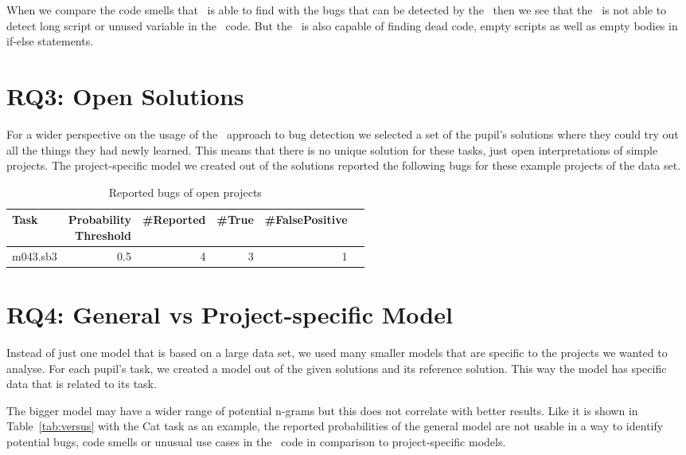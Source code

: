 When we compare the code smells that \litterbox\ is able to find with the bugs that can be detected by the \ngram\, then we see that the \ngram\ is not able to detect long script or unused variable in the \scratch\ code. But the \ngram\ is also capable of finding dead code, empty scripts as well as empty bodies in if-else statements. 
 

\section{RQ3: Open Solutions}\label{sec:gram_size}
For a wider perspective on the usage of the \ngram\ approach to bug detection we selected a set of the pupil's solutions where they could try out all the things they had newly learned. This means that there is no unique solution for these tasks, just open interpretations of simple projects. The project-specific model we created out of the solutions reported the following bugs for these example projects of the data set. 

\begin{table}[H]
    \centering
    \caption[Reported bugs of open projects]{\label{tab:open}Reported bugs of open projects}
    \begin{tabular}{lrrrrr}
        \toprule
        Task & \parbox[t]{2.2cm}{Probability\\Threshold} & \#Reported & \#True & \#FalsePositive \\
        \midrule
        m043.sb3 & 0.5 & 4 & 3 & 1 \\        
        \bottomrule
    \end{tabular}
\end{table}


\section{RQ4: General vs Project-specific Model}\label{sec:project-specific}
Instead of just one model that is based on a large data set, we used many smaller models that are specific to the projects we wanted to analyse. For each pupil's task, we created a model out of the given solutions and its reference solution. This way the model has specific data that is related to its task.

The bigger model may have a wider range of potential n-grams but this does not correlate with better results. Like it is shown in Table~\ref{tab:versus} with the Cat task as an example, the reported probabilities of the general model are not usable in a way to identify potential bugs, code smells or unusual use cases in the \scratch\ code in comparison to project-specific models. 

